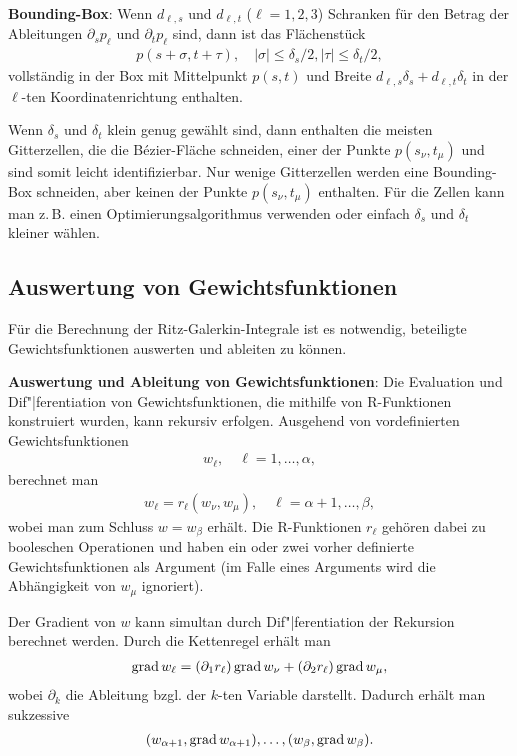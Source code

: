 \textbf{Bounding-Box}:
Wenn $d_{\ell,s}$ und $d_{\ell,t}$ ($\ell = 1, 2, 3$) Schranken für den Betrag der Ableitungen
$\partial_s p_\ell$ und $\partial_t p_\ell$ sind, dann ist das Flächenstück
\begin{align*}
    p(s + \sigma, t + \tau),\quad
    |\sigma| \le \delta_s/2,
    |\tau| \le \delta_t/2,
\end{align*}
vollständig in der Box mit Mittelpunkt $p(s, t)$ und Breite
$d_{\ell,s}\delta_s + d_{\ell,t}\delta_t$ in der $\ell$-ten Koordinatenrichtung enthalten.

Wenn $\delta_s$ und $\delta_t$ klein genug gewählt sind,
dann enthalten die meisten Gitterzellen, die die Bézier-Fläche schneiden,
einer der Punkte $p(s_\nu, t_\mu)$ und sind somit leicht identifizierbar.
Nur wenige Gitterzellen werden eine Bounding-Box schneiden, aber keinen der Punkte
$p(s_\nu, t_\mu)$ enthalten.
Für die Zellen kann man z.\,B. einen Optimierungsalgorithmus verwenden oder
einfach $\delta_s$ und $\delta_t$ kleiner wählen.

\subsection{%
    Auswertung von Gewichtsfunktionen%
}

Für die Berechnung der Ritz-Galerkin-Integrale ist es notwendig, beteiligte Gewichtsfunktionen
auswerten und ableiten zu können.

\textbf{Auswertung und Ableitung von Gewichtsfunktionen}:
Die Evaluation und Dif"|ferentiation von Gewichtsfunktionen, die mithilfe von R-Funktionen
konstruiert wurden, kann rekursiv erfolgen.
Ausgehend von vordefinierten Gewichtsfunktionen
\begin{align*}
    w_\ell,\quad
    \ell = 1, \dotsc, \alpha,
\end{align*}
berechnet man
\begin{align*}
    w_\ell = r_\ell(w_\nu, w_\mu),\quad
    \ell = \alpha + 1, \dotsc, \beta,
\end{align*}
wobei man zum Schluss $w = w_\beta$ erhält.
Die R-Funktionen $r_\ell$ gehören dabei zu booleschen Operationen und haben ein
oder zwei vorher definierte Gewichtsfunktionen als Argument
(im Falle eines Arguments wird die Abhängigkeit von $w_\mu$ ignoriert).

Der Gradient von $w$ kann simultan durch Dif"|ferentiation der Rekursion berechnet werden.
Durch die Kettenregel erhält man
\begin{align*}
    \operatorname{grad} w_\ell
    = (\partial_1 r_\ell) \operatorname{grad} w_\nu + (\partial_2 r_\ell) \operatorname{grad} w_\mu,
\end{align*}
wobei $\partial_k$ die Ableitung bzgl. der $k$-ten Variable darstellt.
Dadurch erhält man sukzessive
\begin{align*}
    (w_{\alpha+1}, \operatorname{grad} w_{\alpha+1}), \dotsc, (w_\beta, \operatorname{grad} w_\beta).
\end{align*}

